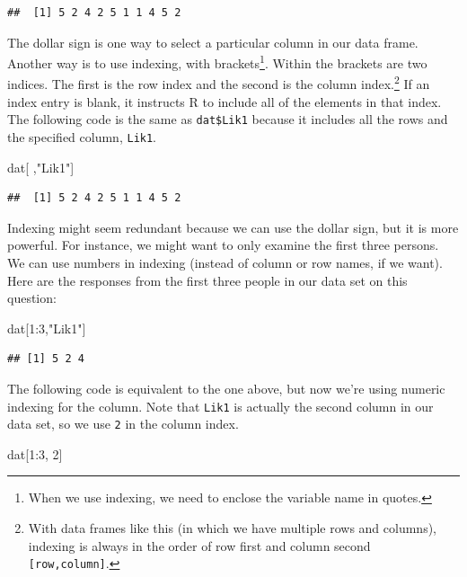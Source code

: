 \documentclass[]{tufte-handout}
\newenvironment{Shaded}{}{}
\newcommand{\DecValTok}[1]{\textcolor[rgb]{0.25,0.63,0.44}{#1}}
\newcommand{\NormalTok}[1]{#1}
\newcommand{\OperatorTok}[1]{\textcolor[rgb]{0.40,0.40,0.40}{#1}}
\newcommand{\StringTok}[1]{\textcolor[rgb]{0.25,0.44,0.63}{#1}}
\begin{document}
\begin{verbatim}
##  [1] 5 2 4 2 5 1 1 4 5 2
\end{verbatim}

The dollar sign is one way to select a particular column in our data
frame. Another way is to use indexing, with brackets\footnote{When we
  use indexing, we need to enclose the variable name in quotes.}. Within
the brackets are two indices. The first is the row index and the second
is the column index.\footnote{With data frames like this (in which we
  have multiple rows and columns), indexing is always in the order of
  row first and column second \texttt{{[}row,column{]}}.} If an index
entry is blank, it instructs R to include all of the elements in that
index. The following code is the same as \texttt{dat\$Lik1} because it
includes all the rows and the specified column, \texttt{Lik1}.

\begin{Shaded}
\begin{Highlighting}[]
\NormalTok{dat[ ,}\StringTok{"Lik1"}\NormalTok{]}
\end{Highlighting}
\end{Shaded}

\begin{verbatim}
##  [1] 5 2 4 2 5 1 1 4 5 2
\end{verbatim}

Indexing might seem redundant because we can use the dollar sign, but it
is more powerful. For instance, we might want to only examine the first
three persons. We can use numbers in indexing (instead of column or row
names, if we want). Here are the responses from the first three people
in our data set on this question:

\begin{Shaded}
\begin{Highlighting}[]
\NormalTok{dat[}\DecValTok{1}\OperatorTok{:}\DecValTok{3}\NormalTok{,}\StringTok{"Lik1"}\NormalTok{]}
\end{Highlighting}
\end{Shaded}

\begin{verbatim}
## [1] 5 2 4
\end{verbatim}

The following code is equivalent to the one above, but now we're using
numeric indexing for the column. Note that \texttt{Lik1} is actually the
second column in our data set, so we use \texttt{2} in the column index.

\begin{Shaded}
\begin{Highlighting}[]
\NormalTok{dat[}\DecValTok{1}\OperatorTok{:}\DecValTok{3}\NormalTok{, }\DecValTok{2}\NormalTok{]}
\end{Highlighting}
\end{Shaded}
\end{document}
